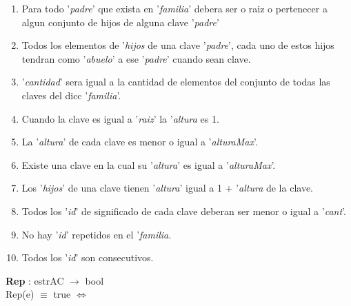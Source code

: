 \documentclass[10pt, a4paper]{article}
\begin{document}
	  \begin{enumerate}
	
		\item Para todo '\textit{padre}' que exista en '\textit{familia}' debera ser o raiz o pertenecer a algun conjunto de hijos de alguna clave '\textit{padre}'
	  
		\item Todos los elementos de '\textit{hijos} de una clave '\textit{padre}', cada uno de estos hijos tendran como '\textit{abuelo}' a ese '\textit{padre}' cuando sean clave.
		
		\item '\textit{cantidad}' sera igual a la cantidad de elementos del conjunto de todas las claves del dicc '\textit{familia}'.
		
		\item Cuando la clave es igual a '\textit{raiz}' la '\textit{altura} es 1.
		
		\item La '\textit{altura}' de cada clave es menor o igual a '\textit{alturaMax}'.
		
		\item Existe una clave en la cual su '\textit{altura}' es igual a '\textit{alturaMax}'.
		
		\item Los '\textit{hijos}' de una clave tienen '\textit{altura}' igual a 1 + '\textit{altura} de la clave.

		\item Todos los '\textit{id}' de significado de cada clave deberan ser menor o igual a '\textit{cant}'.
		
		\item No hay '\textit{id}' repetidos en el '\textit{familia}.
		
		\item Todos los '\textit{id}' son consecutivos.
		
	  \end{enumerate}
	 
	
	   \textbf{Rep} : estrAC $\longrightarrow$ bool\\
	        Rep(e) $\equiv$ true $\Longleftrightarrow$\\
	
\end{document}
